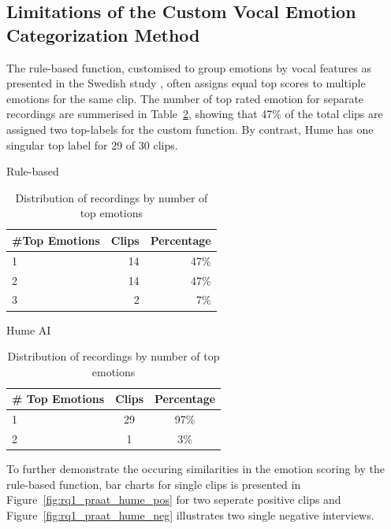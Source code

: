   

\subsection{Limitations of the Custom Vocal Emotion Categorization Method}

The rule-based function, customised to group emotions by vocal features as presented in the Swedish study \autocite{Ekberg2023}, often assigns equal top scores to multiple emotions for the same clip. 
The number of top rated emotion for separate recordings are summerised in Table~\ref{tab:rq1_number_rec_top}, showing that 47\% of the total clips are assigned two top-labels for the custom function. By contrast, Hume has one singular top label for 29 of 30 clips. 
\begin{table}[H]
    \centering
    \begin{subtable}[t]{0.4\textwidth}
    
    \caption{Rule-based}
    \begin{tabular}{l r r}
      \toprule
      \#Top Emotions & Clips & Percentage \\
      \midrule
      1               & 14         & 47\%       \\
      2               & 14          & 47\%       \\
      3               & 2          & 7\%       \\
      \bottomrule
    \end{tabular}
    \label{tab:praat_tie_summary}
  \end{subtable}
  \hfill
  \begin{subtable}[t]{0.4\textwidth}
    \caption{Hume AI}
    \label{tab:top_emotions_distribution_2}
    \begin{tabular}{lcc}
    \toprule
    \# Top Emotions & Clips & Percentage \\
    \midrule
    1               & 29         & 97\%       \\
    2               & 1          &  3\%       \\
    \bottomrule
    \end{tabular}
\end{subtable}
\caption{Distribution of recordings by number of top emotions}
\label{tab:rq1_number_rec_top}
\end{table}
    
To further demonstrate the occuring similarities in the emotion scoring by the rule-based function, bar charts for single clips is presented in Figure~\ref{fig:rq1_praat_hume_pos} for two seperate positive clips and Figure~\ref{fig:rq1_praat_hume_neg} illustrates two single negative interviews. 

